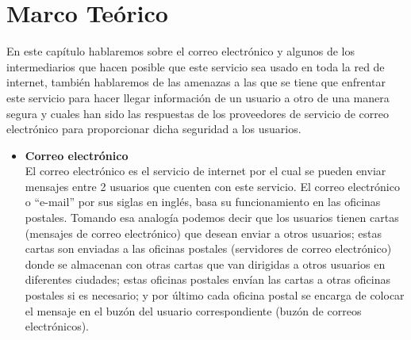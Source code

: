 \documentclass[12pt,oneside,onecolumn,openany]{report}
\begin{document}
\chapter{Marco Teórico} %
En  este  capítulo  hablaremos  sobre  el  correo  electrónico  y  algunos  de  los intermediarios que hacen posible que este servicio sea usado en toda la red de  internet, también  hablaremos  de  las  amenazas a  las  que  se  tiene  que  enfrentar  este  servicio para  hacer  llegar  información  de  un  usuario  a  otro  de  una  manera  segura  y  cuales  han 
sido   las   respuestas   de   los   proveedores   de   servicio   de   correo   electrónico   para proporcionar dicha seguridad a los usuarios. 
\begin{itemize}

\item \textbf{Correo electrónico} \\
El  correo  electrónico  es  el  servicio  de  internet  por  el cual  se  pueden  enviar  mensajes entre 2 usuarios que cuenten con este servicio. El correo electrónico o “e-mail”
 por sus siglas en inglés, basa su funcionamiento en las oficinas postales. Tomando esa analogía podemos  decir  que  los  usuarios  tienen  cartas  (mensajes  de  correo  electrónico)  que desean  enviar  a  otros  usuarios;  estas  cartas  son  enviadas  a 
las  oficinas  postales (servidores de correo electrónico) donde se almacenan con otras cartas que van dirigidas a otros usuarios en diferentes ciudades; estas oficinas postales envían  las cartas a otras 
oficinas postales  si es  necesario;  y por  último cada oficina postal se  encarga de colocar el mensaje en el  buzón del usuario correspondiente (buzón  de  correos  electrónicos).


\end{itemize}
\end{document}
